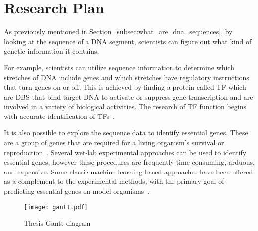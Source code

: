 \chapter{Research Plan}
\label{cha:research_plan}

As previously mentioned in Section~\ref{subsec:what_are_dna_sequences}, by looking at the sequence of a DNA segment, scientists can figure out what kind of genetic information it contains. 

For example, scientists can utilize sequence information to determine which stretches of DNA include genes and which stretches have regulatory instructions that turn genes on or off. This is achieved by finding a protein called \gls{TF} which are \gls{DBS} that bind target DNA to activate or suppress gene transcription and are involved in a variety of biological activities. The research of \gls{TF} function begins with accurate identification of \gls{TF}s~\cite{Hu2019AnimalTFDBFactors}.

It is also possible to explore the sequence data to identify essential genes. These are a group of genes that are required for a living organism's survival or reproduction~\cite{Zhang2020DeepHE:Learning}. Several wet-lab experimental approaches can be used to identify essential genes, however these procedures are frequently time-consuming, arduous, and expensive. Some classic machine learning-based approaches have been offered as a complement to the experimental methods, with the primary goal of predicting essential genes on model organisms~\cite{Zhang2020DeepHE:Learning}.

\begin{figure}[htbp]
    \centering
    \texttt{[image: gantt.pdf]}
    \caption{Thesis Gantt diagram}
    \label{fig:gantt}
\end{figure}